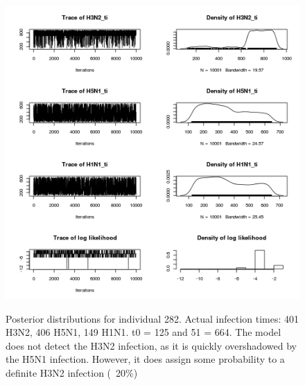\documentclass[a4paper,11pt,twoside]{article}
\begin{document}
\begin{figure}[H]
\begin{centering}
\includegraphics[scale=0.8]{282_mcmc.png}\\
\caption{Posterior distributions for individual 282. Actual infection times: 401 H3N2, 406 H5N1, 149 H1N1. t0 = 125 and 51 = 664. The model does not detect the H3N2 infection, as it is quickly overshadowed by the H5N1 infection. However, it does assign some probability to a definite H3N2 infection (~20\%)}
\end{centering}
\end{figure}
\end{document}
